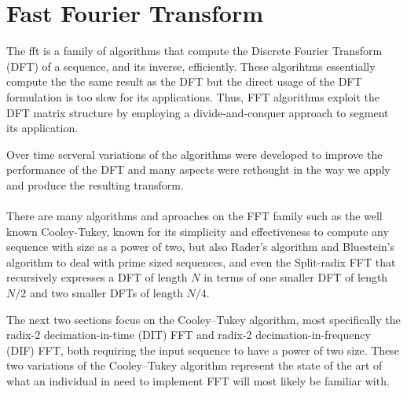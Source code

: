 \documentclass[
  oneside,
  11pt, a4paper,
  footinclude=true,
  headinclude=true,
  cleardoublepage=empty
]{scrbook}
\begin{document}
\section{Fast Fourier Transform} \label{sec:fast-fourier-transform}

The \acrfull{fft} is a family of algorithms that compute the Discrete Fourier Transform (DFT) of a sequence, and its inverse, efficiently. These algorihtms essentially compute the the same result as the DFT but the direct usage of the DFT formulation is too slow for its applications. Thus, FFT algorithms exploit the DFT matrix structure by employing a divide-and-conquer approach \cite{chu1999inside} to segment its application.

Over time serveral variations of the algorithms were developed to improve the performance of the DFT and many aspects were rethought in the way we apply and produce the resulting transform.



\paragraph{}
There are many algorithms and aproaches on the FFT family such as the well known Cooley-Tukey, known for its simplicity and effectiveness to compute any sequence with size as a power of two, but also Rader's algorithm \cite{rader1968discrete} and Bluestein's algorithm \cite{bluestein1970linear} to deal with prime sized sequences, and even the Split-radix FFT \cite{yavne1968economical} that recursively expresses a DFT of length \(N\) in terms of one smaller DFT of length \(N/2\) and two smaller DFTs of length \(N/4\). 


The next two sections focus on the Cooley–Tukey algorithm, most specifically the radix-2 decimation-in-time (DIT) FFT and radix-2 decimation-in-frequency (DIF) FFT, both requiring the input sequence to have a power of two size. These two variations of the Cooley–Tukey algorithm represent the state of the art of what an individual in need to implement FFT will most likely be familiar with.
\end{document}
